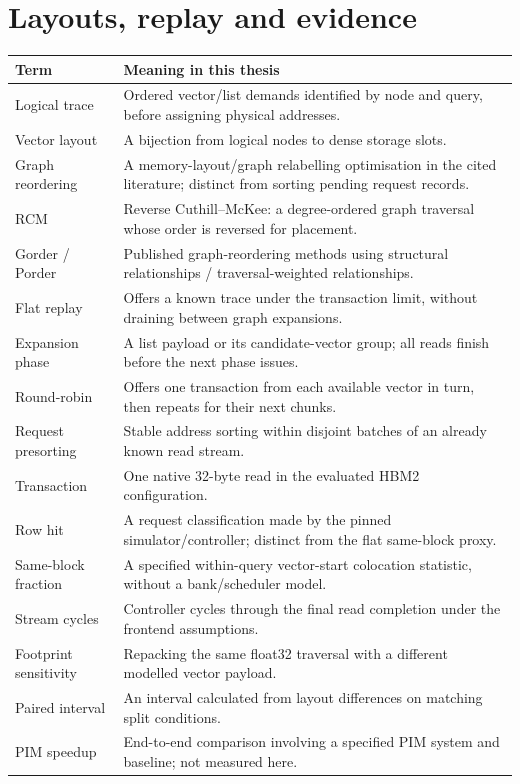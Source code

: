 \documentclass[11pt,a4paper]{report}
\begin{document}
\section{Layouts, replay and evidence}
\begin{longtable}{p{}p{}}\toprule
Term & Meaning in this thesis\\\midrule\endhead
Logical trace & Ordered vector/list demands identified by node and query, before assigning physical addresses.\\
Vector layout & A bijection from logical nodes to dense storage slots.\\
Graph reordering & A memory-layout/graph relabelling optimisation in the cited literature; distinct from sorting pending request records.\\
RCM & Reverse Cuthill--McKee: a degree-ordered graph traversal whose order is reversed for placement.\\
Gorder / Porder & Published graph-reordering methods using structural relationships / traversal-weighted relationships.\\
Flat replay & Offers a known trace under the transaction limit, without draining between graph expansions.\\
Expansion phase & A list payload or its candidate-vector group; all reads finish before the next phase issues.\\
Round-robin & Offers one transaction from each available vector in turn, then repeats for their next chunks.\\
Request presorting & Stable address sorting within disjoint batches of an already known read stream.\\
Transaction & One native 32-byte read in the evaluated HBM2 configuration.\\
Row hit & A request classification made by the pinned simulator/controller; distinct from the flat same-block proxy.\\
Same-block fraction & A specified within-query vector-start colocation statistic, without a bank/scheduler model.\\
Stream cycles & Controller cycles through the final read completion under the frontend assumptions.\\
Footprint sensitivity & Repacking the same float32 traversal with a different modelled vector payload.\\
Paired interval & An interval calculated from layout differences on matching split conditions.\\
PIM speedup & End-to-end comparison involving a specified PIM system and baseline; not measured here.\\\bottomrule
\end{longtable}
\clearpage{}
\begingroup\raggedright

\endgroup
\end{document}
